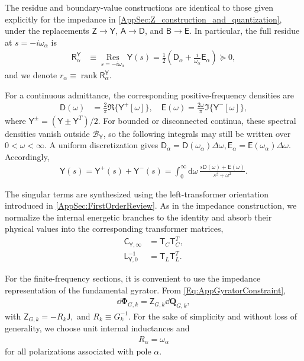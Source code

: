 \documentclass[prx,aps,twocolumn,article]{revtex4-2}
\newcommand{\msf}[1]{\mathsf{#1}}
\newcommand{\bsb}[1]{\boldsymbol{#1}}
\newcommand{\bPhi}{\bsb{\Phi}}
\newcommand{\bQ}{\bsb{Q}}
\newcommand{\dbQ}{\dd\bQ}
\newcommand{\dbPhi}{\dd\bPhi}
\newcommand{\msT}{\msf{T}}
\newcommand{\msY}{\msf{Y}}
\newcommand{\msZ}{\msf{Z}}
\newcommand{\msL}{\msf{L}}
\newcommand{\msC}{\msf{C}}
\newcommand{\msA}{\msf{A}}
\newcommand{\msB}{\msf{B}}
\newcommand{\msD}{\msf{D}}
\newcommand{\msE}{\msf{E}}
\newcommand{\msR}{\msf{R}}
\begin{document}
The residue and boundary-value constructions are identical to those
given explicitly for the impedance in
\cref{AppSec:Z_construction_and_quantization}, under the
replacements
$\msZ\rightarrow\msY$,
$\msA\rightarrow\msD$, and
$\msB\rightarrow\msE$.
In particular, the full residue at $s=-i\omega_\alpha$ is
\begin{align}
    \msR_\alpha^\msY
    &\equiv
    \underset{s=-i\omega_\alpha}{\operatorname{Res}}
    \msY(s)=
    \frac{1}{2}
    \left(
        \msD_\alpha
        +
        \frac{i}{\omega_\alpha}
        \msE_\alpha
    \right)
    \succeq0,
    \label{Eq:YFullPoleResidue}
\end{align}
and we denote $r_\alpha \equiv\operatorname{rank}\msR_\alpha^\msY$.

For a continuous admittance, the corresponding positive-frequency
densities are
\begin{align}
    \msD(\omega)
    &=
    \frac{2}{\pi}
    \Re\{\msY^+[\omega]\}, \quad
    \msE(\omega)
    =
    \frac{2\omega}{\pi}
    \Im\{\msY^-[\omega]\},
    \label{Eq:YContinuousPoleMapping}
\end{align}
where $\msY^\pm=(\msY\pm\msY^T)/2$. For bounded or disconnected continua, these spectral densities vanish outside $\mathcal B_{\msY}$, so the following integrals may still be written over $0<\omega<\infty$. A uniform discretization gives $\msD_\alpha =\msD(\omega_\alpha)\Delta\omega, \msE_\alpha=   \msE(\omega_\alpha)\Delta\omega$. Accordingly,
\begin{align}
    \msY(s)
    =
    \msY^+(s)+\msY^-(s)
    =
    \int_0^\infty
    \mathrm{d}\omega\,
    \frac{
        s\msD(\omega)+\msE(\omega)
    }{
        s^2+\omega^2
    }.
    \label{Eq:CauerContinuumY}
\end{align}

The singular terms are synthesized using the left-transformer
orientation introduced in \cref{AppSec:FirstOrderReview}.
As in the impedance construction, we normalize the internal energetic
branches to the identity and absorb their physical values into the
corresponding transformer matrices,
\begin{align}
    \msC_{\msY,\infty}
    &=
    \msT_C\msT_C^T,
    \nonumber\\
    \msL_{\msY,0}^{-1}
    &=
    \msT_L\msT_L^T.
    \label{Eq:YInfZeroSynthesis}
\end{align}

For the finite-frequency sections, it is convenient to use the
impedance representation of the fundamental gyrator. From
\cref{Eq:AppGyratorConstraint},
\begin{align}
    \dbPhi_{G,k}
    =
    \msZ_{G,k}\dbQ_{G,k},
    \label{Eq:YGyratorImpedance}
\end{align}
with $\msZ_{G,k} =-R_k\msf{J},$ and $ R_k\equiv G_k^{-1}$. For the sake of simplicity and without loss of generality, we choose unit internal inductances and
\begin{align}
    R_\alpha  = \omega_\alpha
    \label{Eq:GaugeChoiceY}
\end{align}
for all polarizations associated with pole $\alpha$.
\end{document}
